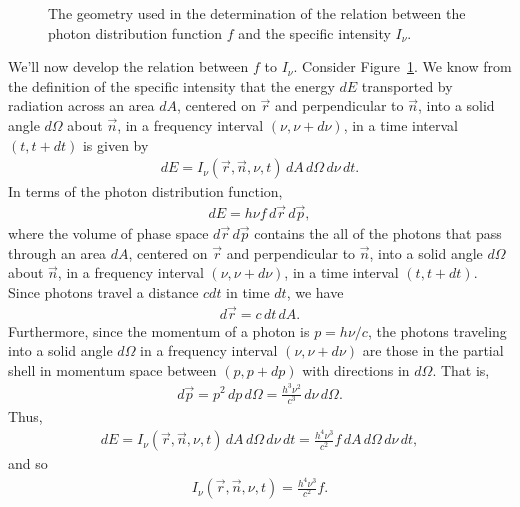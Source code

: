 \begin{figure}
\begin{center}
\end{center}
\caption{The geometry used in the determination of the relation between
  the photon distribution function $f$ and the specific intensity
  $I_\nu$.}
\label{fig-photon-distribution-function}
\end{figure}

We'll now develop the relation between $f$ to $I_\nu$. Consider
Figure~\ref{fig-photon-distribution-function}. We know from the
definition of the specific intensity that the energy $dE$ transported by
radiation across an area $dA$, centered on $\vec r$ and perpendicular to
$\vec n$, into a solid angle $d\Omega$ about $\vec n$, in a frequency
interval $(\nu,
\nu+d\nu)$, in a time interval $(t,t+dt)$ is given by
\begin{align}
dE = I_\nu(\vec r, \vec n, \nu, t)\,dA\,d\Omega\,d\nu\,dt.
\end{align}
In terms of the photon distribution function, 
\begin{align}
dE = h\nu f\,d\vec r\,d\vec p,
\end{align}
where the volume of phase space $d\vec r\,d\vec p$ contains the all of
the photons that pass through an area $dA$, centered on $\vec r$ and
perpendicular to $\vec n$, into a solid angle $d\Omega$ about $\vec n$,
in a frequency interval $(\nu, \nu+d\nu)$, in a time interval
$(t,t+dt)$. Since photons travel a distance $c dt$ in time $dt$, we have
\begin{align}
d\vec r = c\,dt\,dA.
\end{align}
Furthermore, since the momentum of a photon is $p = h\nu/c$, the photons
traveling into a solid angle $d\Omega$ in a frequency
interval $(\nu,
\nu+d\nu)$ are those in the partial shell in momentum space between
$(p,p+dp)$ with directions in $d\Omega$. That is,
\begin{align}
d\vec p = p^2\,dp\,d\Omega = \frac{h^3\nu^2}{c^3}\,d\nu\,d\Omega.
\end{align}
Thus, 
\begin{align}
dE = I_\nu(\vec r, \vec n, \nu, t)\,dA\,d\Omega\,d\nu\,dt
= \frac{h^4\nu^3}{c^2}f\,dA\,d\Omega\,d\nu\,dt,
\end{align}
and so
\begin{align}
I_\nu(\vec r, \vec n, \nu, t)
= \frac{h^4\nu^3}{c^2}f.
\end{align}

